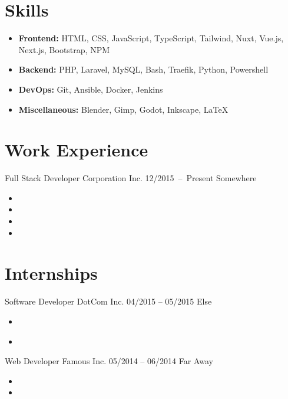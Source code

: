 \documentclass[9pt]{saiba-cv}
\begin{document}
\begin{minipage}[c][\textheight][t]{0.725\textwidth}
  \vspace{0.5cm}
  \section*{Skills}
  \begin{itemize}[leftmargin=0em]
    \item[] \textbf{Frontend:} HTML, CSS, JavaScript, TypeScript, Tailwind, Nuxt, Vue.js, Next.js, Bootstrap, NPM
    \item[] \textbf{Backend:} PHP, Laravel, MySQL, Bash, Traefik, Python, Powershell
    \item[] \textbf{DevOps:} Git, Ansible, Docker, Jenkins
    \item[] \textbf{Miscellaneous:} Blender, Gimp, Godot, Inkscape, LaTeX
  \end{itemize}


  \section*{Work Experience}
  \entry
    {Full Stack Developer}
    {Corporation Inc.}
    {12/2015\ --\ Present}
    {Somewhere}
    {\begin{itemize}[leftmargin=1em,topsep=0em]
      \item \lorem
      \item \lorem
      \item \lorem
      \item \lorem
    \end{itemize}}


  \section*{Internships}
  \entry
    {Software Developer}
    {DotCom Inc.}
    {04/2015 -- 05/2015}
    {Else}
    {\begin{itemize}[leftmargin=1em,topsep=0em]
      \item \lorem
      \item \lorem \\
    \end{itemize}}

  \entry
    {Web Developer}
    {Famous Inc.}
    {05/2014 -- 06/2014}
    {Far Away}
    {\begin{itemize}[leftmargin=1em,topsep=0em]
      \item \lorem
      \item \lorem
    \end{itemize}}


\end{minipage}
\end{document}
